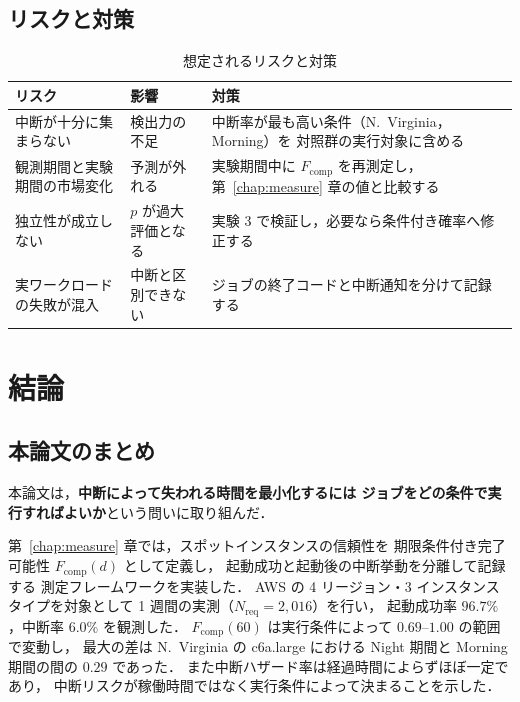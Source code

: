 \documentclass[11pt,a4paper]{ltjsreport}
\newcommand{\Fcomp}{F_{\mathrm{comp}}}
\newcommand{\Nreq}{N_{\mathrm{req}}}
\begin{document}
\section{リスクと対策}

\begin{table}[htbp]
\centering
\caption{想定されるリスクと対策}
\label{tab:risks}
\small
\begin{tabularx}{\textwidth}{@{}XXX@{}}
\toprule
リスク & 影響 & 対策 \\
\midrule
中断が十分に集まらない
  & 検出力の不足
  & 中断率が最も高い条件（N.~Virginia，Morning）を
    対照群の実行対象に含める \\
\addlinespace
観測期間と実験期間の市場変化
  & 予測が外れる
  & 実験期間中に $\Fcomp$ を再測定し，
    第~\ref{chap:measure} 章の値と比較する \\
\addlinespace
独立性が成立しない
  & $p$ が過大評価となる
  & 実験 3 で検証し，必要なら条件付き確率へ修正する \\
\addlinespace
実ワークロードの失敗が混入
  & 中断と区別できない
  & ジョブの終了コードと中断通知を分けて記録する \\
\bottomrule
\end{tabularx}
\end{table}

\chapter{結論}
\label{chap:conclusion}

\section{本論文のまとめ}

本論文は，\textbf{中断によって失われる時間を最小化するには
ジョブをどの条件で実行すればよいか}という問いに取り組んだ．

第~\ref{chap:measure} 章では，スポットインスタンスの信頼性を
期限条件付き完了可能性 $\Fcomp(d)$ として定義し，
起動成功と起動後の中断挙動を分離して記録する
測定フレームワークを実装した．
AWS の 4 リージョン・3 インスタンスタイプを対象として
1 週間の実測（$\Nreq = 2{,}016$）を行い，
起動成功率 $96.7\%$，中断率 $6.0\%$ を観測した．
$\Fcomp(60)$ は実行条件によって $0.69$--$1.00$ の範囲で変動し，
最大の差は N.~Virginia の c6a.large における
Night 期間と Morning 期間の間の $0.29$ であった．
また中断ハザード率は経過時間によらずほぼ一定であり，
中断リスクが稼働時間ではなく実行条件によって決まることを示した．
\end{document}
